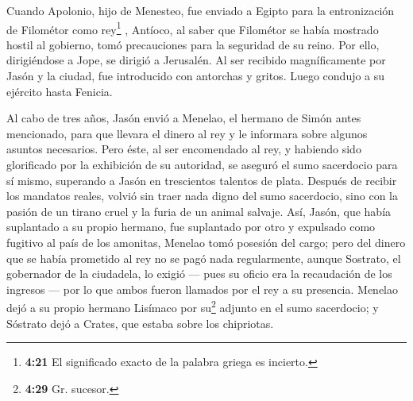  Cuando Apolonio, hijo de Menesteo, fue enviado a Egipto
para la entronización de Filométor como rey\footnote{\textbf{4:21} El
  significado exacto de la palabra griega es incierto.} , Antíoco, al
saber que Filométor se había mostrado hostil al gobierno, tomó
precauciones para la seguridad de su reino. Por ello, dirigiéndose a
Jope, se dirigió a Jerusalén.  Al ser recibido
magníficamente por Jasón y la ciudad, fue introducido con antorchas y
gritos. Luego condujo a su ejército hasta Fenicia.

 Al cabo de tres años, Jasón envió a Menelao, el hermano
de Simón antes mencionado, para que llevara el dinero al rey y le
informara sobre algunos asuntos necesarios.  Pero éste,
al ser encomendado al rey, y habiendo sido glorificado por la exhibición
de su autoridad, se aseguró el sumo sacerdocio para sí mismo, superando
a Jasón en trescientos talentos de plata.  Después de
recibir los mandatos reales, volvió sin traer nada digno del sumo
sacerdocio, sino con la pasión de un tirano cruel y la furia de un
animal salvaje.  Así, Jasón, que había suplantado a su
propio hermano, fue suplantado por otro y expulsado como fugitivo al
país de los amonitas,  Menelao tomó posesión del cargo;
pero del dinero que se había prometido al rey no se pagó nada
regularmente, aunque Sostrato, el gobernador de la ciudadela, lo exigió
---  pues su oficio era la recaudación de los ingresos
--- por lo que ambos fueron llamados por el rey a su presencia.
 Menelao dejó a su propio hermano Lisímaco por
su\footnote{\textbf{4:29} Gr. sucesor.} adjunto en el sumo sacerdocio; y
Sóstrato dejó a Crates, que estaba sobre los chipriotas.

